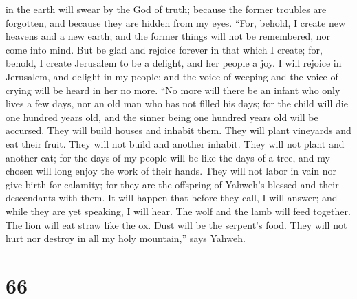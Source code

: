 in the earth will swear by the God of truth; because the former troubles
are forgotten, and because they are hidden from my eyes. 
``For, behold, I create new heavens and a new earth; and the former
things will not be remembered, nor come into mind.  But
be glad and rejoice forever in that which I create; for, behold, I
create Jerusalem to be a delight, and her people a joy. 
I will rejoice in Jerusalem, and delight in my people; and the voice of
weeping and the voice of crying will be heard in her no more.
 ``No more will there be an infant who only lives a few
days, nor an old man who has not filled his days; for the child will die
one hundred years old, and the sinner being one hundred years old will
be accursed.  They will build houses and inhabit them.
They will plant vineyards and eat their fruit.  They will
not build and another inhabit. They will not plant and another eat; for
the days of my people will be like the days of a tree, and my chosen
will long enjoy the work of their hands.  They will not
labor in vain nor give birth for calamity; for they are the offspring of
Yahweh's blessed and their descendants with them.  It
will happen that before they call, I will answer; and while they are yet
speaking, I will hear.  The wolf and the lamb will feed
together. The lion will eat straw like the ox. Dust will be the
serpent's food. They will not hurt nor destroy in all my holy
mountain,'' says Yahweh.

\hypertarget{section-63}{%
\section{66}\label{section-63}}

